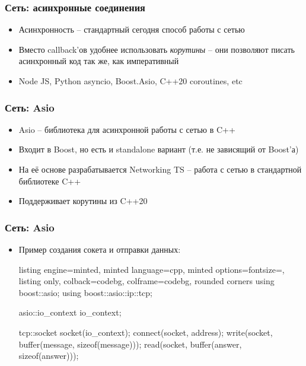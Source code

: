\documentclass[10pt]{beamer}
\begin{document}
\begin{frame}[fragile]
\frametitle{Сеть: асинхронные соединения}
\begin{itemize}
\item Асинхронность -- стандартный сегодня способ работы с сетью
\pause
\item Вместо callback'ов удобнее использовать \textit{корутины} -- они позволяют писать асинхронный код так же, как императивный
\pause
\item Node JS, Python asyncio, Boost.Asio, C++20 coroutines, etc
\end{itemize}
\end{frame}

\begin{frame}[fragile]
\frametitle{Сеть: Asio}
\begin{itemize}
\item Asio -- библиотека для асинхронной работы с сетью в C++
\pause
\item Входит в Boost, но есть и standalone вариант (т.е. не зависящий от Boost'а)
\pause
\item На её основе разрабатывается Networking TS -- работа с сетью в стандартной библиотеке C++
\pause
\item Поддерживает корутины из C++20
\end{itemize}
\end{frame}

\begin{frame}[fragile]
\frametitle{Сеть: Asio}
\begin{itemize}
\item Пример создания сокета и отправки данных:
\begin{tcblisting}{listing engine=minted, minted language=cpp, minted options={fontsize=\scriptsize}, listing only, colback=codebg, colframe=codebg, rounded corners}
using boost::asio;
using boost::asio::ip::tcp;

asio::io_context io_context;

tcp::socket socket(io_context);
connect(socket, address);
write(socket, buffer(message, sizeof(message)));
read(socket, buffer(answer, sizeof(answer)));
\end{tcblisting}
\end{itemize}
\end{frame}
\end{document}
